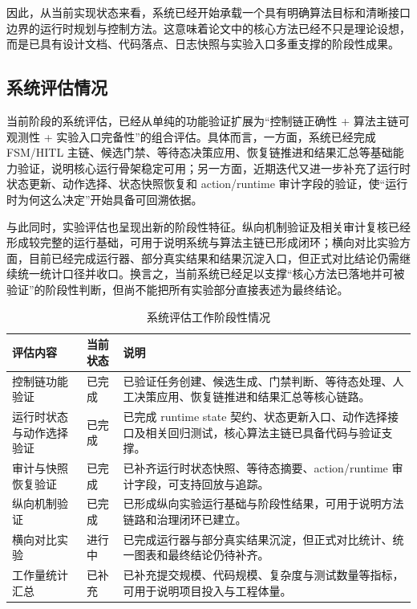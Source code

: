 因此，从当前实现状态来看，系统已经开始承载一个具有明确算法目标和清晰接口边界的运行时规划与控制方法。这意味着论文中的核心方法已经不只是理论设想，而是已具有设计文档、代码落点、日志快照与实验入口多重支撑的阶段性成果。

\subsection{系统评估情况}

当前阶段的系统评估，已经从单纯的功能验证扩展为“控制链正确性 + 算法主链可观测性 + 实验入口完备性”的组合评估。具体而言，一方面，系统已经完成 FSM/HITL 主链、候选门禁、等待态决策应用、恢复链推进和结果汇总等基础能力验证，说明核心运行骨架稳定可用；另一方面，近期迭代又进一步补充了运行时状态更新、动作选择、状态快照恢复和 action/runtime 审计字段的验证，使“运行时为何这么决定”开始具备可回溯依据。

与此同时，实验评估也呈现出新的阶段性特征。纵向机制验证及相关审计复核已经形成较完整的运行基础，可用于说明系统与算法主链已形成闭环；横向对比实验方面，目前已经完成运行器、部分真实结果和结果沉淀入口，但正式对比结论仍需继续统一统计口径并收口。换言之，当前系统已经足以支撑“核心方法已落地并可被验证”的阶段性判断，但尚不能把所有实验部分直接表述为最终结论。

\begin{table}[htbp]
	\centering
	\caption{系统评估工作阶段性情况}
	\label{tab:midterm-evaluation-status}
	\renewcommand{\arraystretch}{1.22}
	\begin{tabularx}{\textwidth}{p{3.4cm}p{2.2cm}>{\raggedright\arraybackslash}X}
		\toprule
		评估内容 & 当前状态 & 说明 \\
		\midrule
		控制链功能验证 & 已完成 & 已验证任务创建、候选生成、门禁判断、等待态处理、人工决策应用、恢复链推进和结果汇总等核心链路。 \\
		运行时状态与动作选择验证 & 已完成 & 已完成 runtime state 契约、状态更新入口、动作选择接口及相关回归测试，核心算法主链已具备代码与验证支撑。 \\
		审计与快照恢复验证 & 已完成 & 已补齐运行时状态快照、等待态摘要、action/runtime 审计字段，可支持回放与追踪。 \\
		纵向机制验证 & 已完成 & 已形成纵向实验运行基础与阶段性结果，可用于说明方法链路和治理闭环已建立。 \\
		横向对比实验 & 进行中 & 已完成运行器与部分真实结果沉淀，但正式对比统计、统一图表和最终结论仍待补齐。 \\
		工作量统计汇总 & 已补充 & 已补充提交规模、代码规模、复杂度与测试数量等指标，可用于说明项目投入与工程体量。 \\
		\bottomrule
	\end{tabularx}
\end{table}

